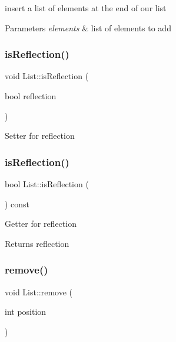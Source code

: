 insert a list of elements at the end of our list 
\begin{DoxyParams}{Parameters}
{\em elements} & list of elements to add \\
\hline
\end{DoxyParams}
\mbox{\label{classList_af9d3726a97cfa3355117f914db6c5ecc}} 
\subsubsection{\texorpdfstring{is\+Reflection()}{isReflection()}\hspace{0.1cm}{\footnotesize\ttfamily [1/2]}}
{\footnotesize\ttfamily void List\+::is\+Reflection (\begin{DoxyParamCaption}\item[{bool}]{reflection }\end{DoxyParamCaption})}

Setter for reflection \mbox{\label{classList_aa5924a5fcbb2907a0eebd04376db84a6}} 
\subsubsection{\texorpdfstring{is\+Reflection()}{isReflection()}\hspace{0.1cm}{\footnotesize\ttfamily [2/2]}}
{\footnotesize\ttfamily bool List\+::is\+Reflection (\begin{DoxyParamCaption}{ }\end{DoxyParamCaption}) const}

Getter for reflection \begin{DoxyReturn}{Returns}
reflection 
\end{DoxyReturn}
\mbox{\label{classList_a29511479f561a5840cdb2b913d9afd00}} 
\subsubsection{\texorpdfstring{remove()}{remove()}}
{\footnotesize\ttfamily void List\+::remove (\begin{DoxyParamCaption}\item[{int}]{position }\end{DoxyParamCaption})}

